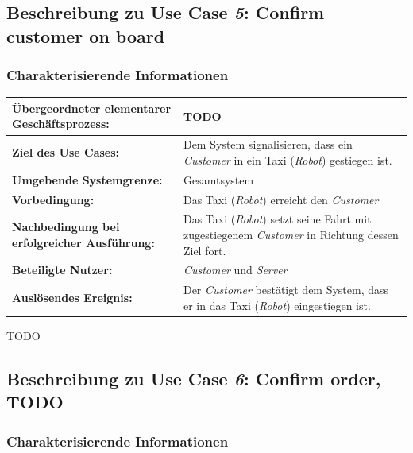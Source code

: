 		\pagebreak

		\subsection{Beschreibung zu Use Case \emph{5}: Confirm customer on board}
			\subsubsection*{Charakterisierende Informationen}
			
			\begin{table}[H]
				\centering
				\begin{tabularx}{\textwidth}{|p{5cm}|X|}
					\hline
					\textbf{Übergeordneter elementarer Geschäftsprozess:} & TODO  \\ \hline
					\textbf{Ziel des Use Cases:} & Dem System signalisieren, dass ein \emph{Customer} in ein Taxi (\emph{Robot}) gestiegen ist. \\ \hline
					\textbf{Umgebende Systemgrenze:} & Gesamtsystem \\ \hline
					\textbf{Vorbedingung:} & Das Taxi (\emph{Robot}) erreicht den \emph {Customer} \\ \hline
					\textbf{Nachbedingung bei erfolgreicher Ausführung:} & Das Taxi (\emph{Robot}) setzt seine Fahrt mit zugestiegenem \emph{Customer} in Richtung dessen Ziel fort. \\ \hline
					\textbf{Beteiligte Nutzer:} & \emph{Customer} und \emph{Server} \\ \hline
					\textbf{Auslösendes Ereignis:} & Der \emph{Customer} bestätigt dem System, dass er in das Taxi (\emph{Robot}) eingestiegen ist. \\
					\hline
				\end{tabularx}
			\end{table}
			
			TODO
	
		\subsection{Beschreibung zu Use Case \emph{6}: Confirm order, TODO}
			\subsubsection*{Charakterisierende Informationen}
			
